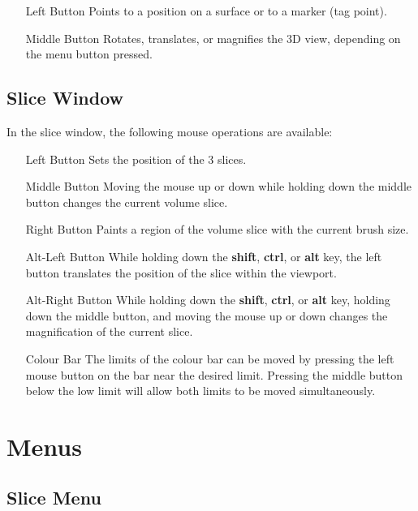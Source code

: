 \begin{itemize}
\item[Left Button]  Points to a position on a surface or to a marker
                    (tag point).
\item[Middle Button]  Rotates, translates, or magnifies the 3D view, depending
                      on the menu button pressed.
\end{itemize}

\subsection{Slice Window}

In the slice window, the following mouse operations are available:

\begin{itemize}
\item[Left Button]  Sets the position of the 3 slices.
\item[Middle Button]  Moving the mouse up or down while holding down the
                      middle button changes the current volume slice.
\item[Right Button]  Paints a region of the volume slice with the current
                     brush size.
\item[Alt-Left Button]  While holding down the {\bf shift}, {\bf ctrl},
                        or {\bf alt} key, the left button translates the
                        position of the slice within the viewport.
\item[Alt-Right Button]  While holding down the {\bf shift}, {\bf ctrl},
                        or {\bf alt} key, holding down the middle button,
                        and moving the mouse up or down changes the
                        magnification of the current slice.
\item[Colour Bar]  The limits of the colour bar can be moved by pressing
                   the left mouse button on the bar near the desired limit.
                   Pressing the middle button below the low limit will allow
                   both limits to be moved simultaneously.
\end{itemize}

\section{Menus}

\subsection{Slice Menu}

